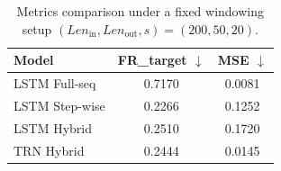 \begin{table}[H]
\centering
\small

\label{tab:fair_metrics}
\begin{tabular}{lcc}
\toprule
Model & FR\_target $\downarrow$ & MSE $\downarrow$ \\
\midrule
LSTM Full-seq & 0.7170 & 0.0081 \\
LSTM Step-wise & 0.2266 & 0.1252 \\
LSTM Hybrid & 0.2510 & 0.1720 \\
TRN Hybrid & 0.2444 & 0.0145 \\
\bottomrule
\end{tabular}

\caption{Metrics comparison under a fixed windowing setup $(Len_\text{in},Len_\text{out},s)=(200, 50, 20)$.}
\end{table}